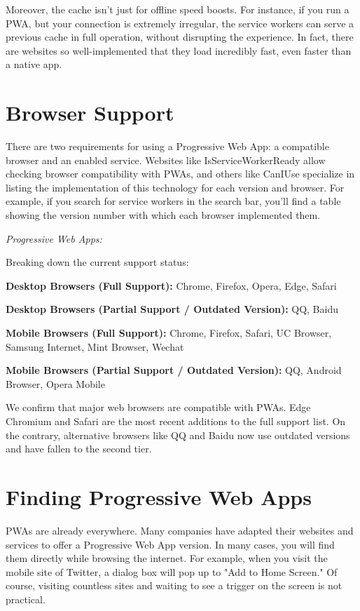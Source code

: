 \documentclass[conference]{IEEEtran}
\begin{document}
Moreover, the cache isn't just for offline speed boosts. For instance, if you run a PWA, but your connection is extremely irregular, the service workers can serve a previous cache in full operation, without disrupting the experience. In fact, there are websites so well-implemented that they load incredibly fast, even faster than a native app.

\section{Browser Support}
There are two requirements for using a Progressive Web App: a compatible browser and an enabled service. Websites like IsServiceWorkerReady allow checking browser compatibility with PWAs, and others like CanIUse specialize in listing the implementation of this technology for each version and browser. For example, if you search for service workers in the search bar, you'll find a table showing the version number with which each browser implemented them.

\textit{Progressive Web Apps:}

Breaking down the current support status:

\textbf{Desktop Browsers (Full Support):} Chrome, Firefox, Opera, Edge, Safari

\textbf{Desktop Browsers (Partial Support / Outdated Version):} QQ, Baidu

\textbf{Mobile Browsers (Full Support):} Chrome, Firefox, Safari, UC Browser, Samsung Internet, Mint Browser, Wechat

\textbf{Mobile Browsers (Partial Support / Outdated Version):} QQ, Android Browser, Opera Mobile

We confirm that major web browsers are compatible with PWAs. Edge Chromium and Safari are the most recent additions to the full support list. On the contrary, alternative browsers like QQ and Baidu now use outdated versions and have fallen to the second tier.

\section{Finding Progressive Web Apps}
PWAs are already everywhere. Many companies have adapted their websites and services to offer a Progressive Web App version. In many cases, you will find them directly while browsing the internet. For example, when you visit the mobile site of Twitter, a dialog box will pop up to "Add to Home Screen." Of course, visiting countless sites and waiting to see a trigger on the screen is not practical.
\end{document}
